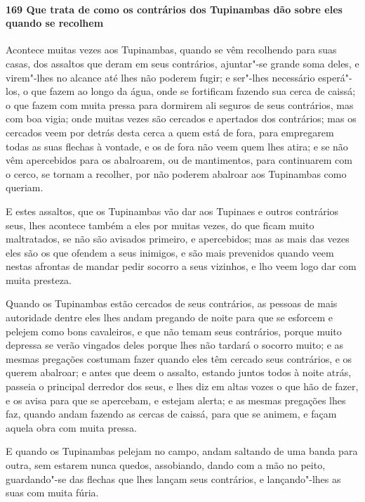 \begin{linenumbers}
\paragraph{169 Que trata de como os contrários dos Tupinambas dão sobre eles quando se
recolhem}\quad
Acontece muitas vezes aos Tupinambas, quando se vêm recolhendo para suas casas, dos
assaltos que deram em seus contrários, ajuntar"-se grande soma deles, e virem"-lhes no
alcance até lhes não poderem fugir; e ser"-lhes necessário esperá"-los, o que fazem ao longo
da água, onde se fortificam fazendo sua cerca de caissá; o que fazem com muita pressa para
dormirem ali seguros de seus contrários, mas com boa vigia; onde muitas vezes são cercados
e apertados dos contrários; mas os cercados veem por detrás desta cerca a quem está de
fora, para empregarem todas as suas flechas à vontade, e os de fora não veem quem lhes
atira; e se não vêm apercebidos para os abalroarem, ou de mantimentos, para continuarem
com o cerco, se tornam a recolher, por não poderem abalroar aos Tupinambas como queriam.

E estes assaltos, que os Tupinambas vão dar aos Tupinaes e outros contrários seus, lhes
acontece também a eles por muitas vezes, do que ficam muito maltratados, se não são
avisados primeiro, e apercebidos; mas as mais das vezes eles são os que ofendem a seus
inimigos, e são mais prevenidos quando veem nestas afrontas de mandar pedir socorro a seus
vizinhos, e lho veem logo dar com muita presteza.

Quando os Tupinambas estão cercados de seus contrários, as pessoas de mais autoridade
dentre eles lhes andam pregando de noite para que se esforcem e pelejem como bons
cavaleiros, e que não temam seus contrários, porque muito depressa se verão vingados deles
porque lhes não tardará o socorro muito; e as mesmas pregações costumam fazer quando eles
têm cercado seus contrários, e os querem abalroar; e antes que deem o assalto, estando
juntos todos à noite atrás, passeia o principal derredor dos seus, e lhes diz em altas
vozes o que hão de fazer, e os avisa para que se apercebam, e estejam alerta; e as mesmas
pregações lhes faz, quando andam fazendo as cercas de caissá, para que se animem, e façam
aquela obra com muita pressa.

E quando os Tupinambas pelejam no campo, andam saltando de uma banda para outra, sem
estarem nunca quedos, assobiando, dando com a mão no peito, guardando"-se das flechas que
lhes lançam seus contrários, e lançando"-lhes as suas com muita fúria.


\end{linenumbers}
